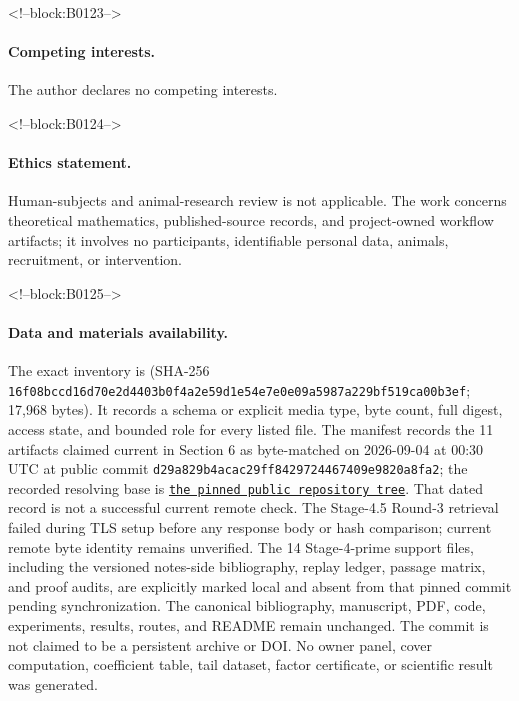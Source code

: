 \documentclass[11pt]{article}
\begin{document}
<!--block:B0123-->
\paragraph{Competing interests.} The author declares no competing
interests.

<!--block:B0124-->
\paragraph{Ethics statement.} Human-subjects and animal-research review
is not applicable. The work concerns theoretical mathematics,
published-source records, and project-owned workflow artifacts; it
involves no participants, identifiable personal data, animals,
recruitment, or intervention.

<!--block:B0125-->
\paragraph{Data and materials availability.}\begingroup\sloppy
The exact inventory is
 (SHA-256
\texttt{16f08bcc\allowbreak{}d16d70e2\allowbreak{}d4403b0f\allowbreak{}4a2e59d1\allowbreak{}e54e7e0e\allowbreak{}09a5987a\allowbreak{}229bf519\allowbreak{}ca00b3ef}; 17,968 bytes).  It records a schema or explicit media type,
byte count, full digest, access state, and bounded role for every listed file.
The manifest records the 11 artifacts claimed current in Section 6 as
byte-matched on 2026-09-04 at 00:30 UTC at public commit
\texttt{d29a829b\allowbreak{}4acac29f\allowbreak{}f8429724\allowbreak{}467409e9\allowbreak{}820a8fa2}; the recorded resolving base is
\href{https://github.com/maris205/hilbert-polya-structure/tree/d29a829b4acac29ff8429724467409e9820a8fa2/flow_systems/papers/32-homology-cover-renormalization-uniformity}{\texttt{the pinned public repository tree}}.
That dated record is not a successful current remote check. The Stage-4.5
Round-3 retrieval failed during TLS setup before any response body or hash
comparison; current remote byte identity remains unverified.
The 14 Stage-4-prime support files, including the versioned notes-side
bibliography, replay ledger, passage matrix, and proof audits, are explicitly
marked local and absent from that pinned commit pending synchronization.  The
canonical bibliography, manuscript, PDF, code, experiments, results, routes,
and README remain unchanged.  The commit is not claimed to be a persistent
archive or DOI.  No owner panel, cover computation, coefficient table, tail
dataset, factor certificate, or scientific result was generated.
\end{document}
